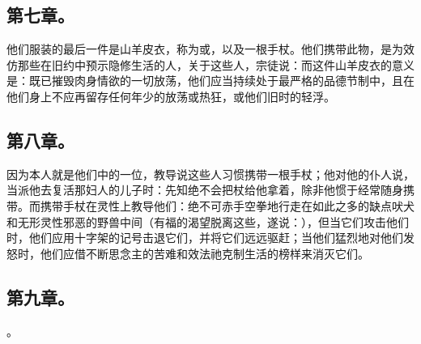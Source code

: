 
\subsection{第七章。}

\par

他们服装的最后一件是山羊皮衣，称为或，以及一根手杖。他们携带此物，是为效仿那些在旧约中预示隐修生活的人，关于这些人，宗徒说：而这件山羊皮衣的意义是：既已摧毁肉身情欲的一切放荡，他们应当持续处于最严格的品德节制中，且在他们身上不应再留存任何年少的放荡或热狂，或他们旧时的轻浮。\par


\subsection{第八章。}

\par

因为本人就是他们中的一位，教导说这些人习惯携带一根手杖；他对他的仆人说，当派他去复活那妇人的儿子时：先知绝不会把杖给他拿着，除非他惯于经常随身携带。而携带手杖在灵性上教导他们：绝不可赤手空拳地行走在如此之多的缺点吠犬和无形灵性邪恶的野兽中间（有福的渴望脱离这些，遂说：），但当它们攻击他们时，他们应用十字架的记号击退它们，并将它们远远驱赶；当他们猛烈地对他们发怒时，他们应借不断思念主的苦难和效法祂克制生活的榜样来消灭它们。\par


\subsection{第九章。}

。\par

